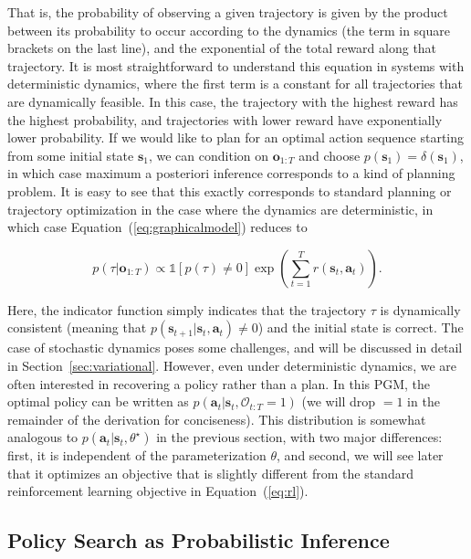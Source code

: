 That is, the probability of observing a given trajectory is given by the product between its probability to occur according to the dynamics (the term in square brackets on the last line), and the exponential of the total reward along that trajectory. It is most straightforward to understand this equation in systems with deterministic dynamics, where the first term is a constant for all trajectories that are dynamically feasible. In this case, the trajectory with the highest reward has the highest probability, and trajectories with lower reward have exponentially lower probability. If we would like to plan for an optimal action sequence starting from some initial state $\mathbf{s}_1$, we can condition on $\mathbf{o}_{1:T}$ and choose $p(\mathbf{s}_1) = \delta(\mathbf{s}_1)$, in which case maximum a posteriori inference corresponds to a kind of planning problem. It is easy to see that this exactly corresponds to standard planning or trajectory optimization in the case where the dynamics are deterministic, in which case Equation~(\ref{eq:graphicalmodel}) reduces to

\begin{equation}
p(\tau | \mathbf{o}_{1:T}) \propto \mathds{1}[p(\tau) \neq 0] \exp\left( \sum_{t=1}^T r(\mathbf{s}_t,\mathbf{a}_t) \right). \label{eq:detmaxent}
\end{equation}

Here, the indicator function simply indicates that the trajectory $\tau$ is dynamically consistent (meaning that $p(\mathbf{s}_{t+1} | \mathbf{s}_t,\mathbf{a}_t) \neq 0$) and the initial state is correct. The case of stochastic dynamics poses some challenges, and will be discussed in detail in Section~\ref{sec:variational}. However, even under deterministic dynamics, we are often interested in recovering a policy rather than a plan. In this PGM, the optimal policy can be written as $p(\mathbf{a}_t|\mathbf{s}_t,\mathcal{O}_{t:T} = 1)$ (we will drop $=1$ in the remainder of the derivation for conciseness). This distribution is somewhat analogous to $p(\mathbf{a}_t|\mathbf{s}_t, \theta^\star)$ in the previous section, with two major differences: first, it is independent of the parameterization $\theta$, and second, we will see later that it optimizes an objective that is slightly different from the standard reinforcement learning objective in Equation~(\ref{eq:rl}).

\subsection{Policy Search as Probabilistic Inference}
\label{sec:maxentinference}

